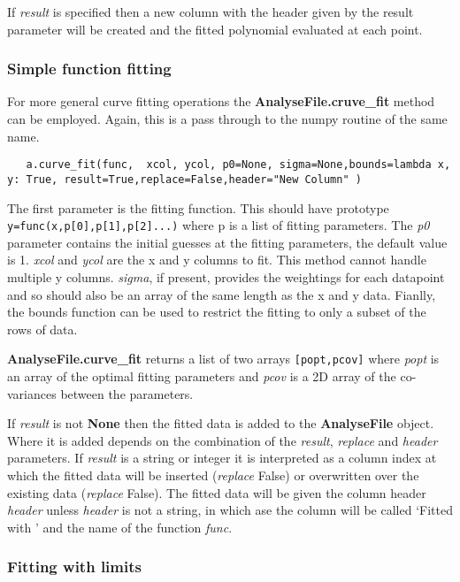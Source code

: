 \documentclass[a4paper,11pt]{scrartcl}
\begin{document}
If \textit{result} is specified then a new column with the header given by the result parameter will be created and the fitted polynomial evaluated at each point.

\subsubsection{Simple function fitting}

For more general curve fitting operations the \textbf{AnalyseFile.cruve\_fit}
method can be employed. Again, this is a pass through to the numpy routine of
the same name.

\begin{lstlisting}
   a.curve_fit(func,  xcol, ycol, p0=None, sigma=None,bounds=lambda x, y: True, result=True,replace=False,header="New Column" )
\end{lstlisting}

The first parameter is the fitting function. This should have prototype
\\\verb:y=func(x,p[0],p[1],p[2]...): where p is a list of fitting parameters.
The \textit{p0} parameter contains the initial guesses at the fitting
parameters, the default value is 1. \textit{xcol} and \textit{ycol} are the x
and y columns to fit. This method cannot handle multiple y columns.
\textit{sigma}, if present, provides the weightings for each datapoint and so
should also be an array of the same length as the x and y data. Fianlly, the
bounds function can be used to restrict the fitting to only a subset of the rows
of data.

\textbf{AnalyseFile.curve\_fit} returns a list of two arrays \verb:[popt,pcov]:
where \textit{popt} is an array of the optimal fitting parameters and
\textit{pcov} is a 2D array of the co-variances between the parameters.

If \textit{result} is not \textbf{None} then the fitted data is added to the \textbf{AnalyseFile}
object. Where it is added depends on the combination of the \textit{result}, \textit{replace}
and \textit{header} parameters. If \textit{result} is a string or integer it is interpreted as a column
index at which the fitted data will be inserted (\textit{replace} False) or overwritten over the existing data (\textit{replace} False).
The fitted data will be given the column header \textit{header} unless \textit{header} is not a string, in which ase the column
will be called `Fitted with ' and the name of the function \textit{func}.


\subsubsection{Fitting with limits}
\end{document}
